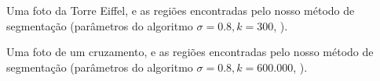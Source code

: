 \documentclass[12pt]{article}
\begin{document}
 \begin{figure}[H]
    \centering
     \hfill
    
    
\end{figure}
 Uma foto da Torre Eiffel, e as regiões encontradas pelo nosso método de segmentação (parâmetros do algoritmo $\sigma = 0.8, k = 300$, ).

 \begin{figure}[H]
    \centering
     \hfill
    
    
\end{figure}
 Uma foto de um cruzamento, e as regiões encontradas pelo nosso método de segmentação (parâmetros do algoritmo $\sigma = 0.8, k = 600.000$, ).
 
\end{document}
